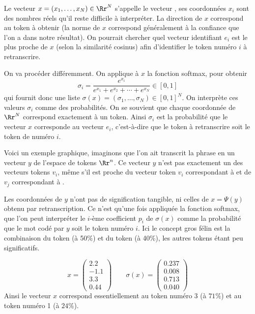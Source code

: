 \documentclass[11pt,class=report,crop=false]{standalone}
\begin{document}
Le vecteur $x = (x_1, \ldots, x_N) \in \Rr^N$ s'appelle le vecteur , ses coordonnées $x_i$ sont des nombres réels qu'il reste difficile à interpréter.
La direction de $x$ correspond au token à obtenir (la norme de $x$ correspond généralement à la confiance que l'on a dans notre résultat). On pourrait chercher quel vecteur identifiant $e_i$ est le plus proche de $x$ (selon la similarité cosinus) afin d'identifier le token numéro $i$ à retranscrire.

On va procéder différemment. On applique à $x$ la fonction softmax, pour obtenir
$$\sigma_i  = \frac{e^{x_i}}{ e^{x_1} + e^{x_2} + \cdots + e^{x_N}} \in [0,1]$$
qui fournit donc une liste $\sigma(x) = (\sigma_1,\ldots,\sigma_N) \in [0,1]^N$.
On interprète ces valeurs $\sigma_i$ comme des probabilités.
On se souvient que chaque coordonnée de $\Rr^N$ correspond exactement à un token.
Ainsi $\sigma_i$ est la probabilité que le vecteur $x$ corresponde au vecteur $e_i$, c'est-à-dire que le token à retranscrire soit le token de numéro $i$.


\begin{exemple}
Voici un exemple graphique, imaginons que l'on ait transcrit la phrase \og{}\fg{} en un vecteur $y$ de l'espace de tokens $\Rr^n$. Ce vecteur $y$ n'est pas exactement un des vecteurs tokens $v_i$, même s'il est proche du vecteur token $v_i$ correspondant à  et de $v_j$ correspondant à .


Les coordonnées de $y$ n'ont pas de signification tangible, ni celles de $x = \Psi(y)$ obtenu par retranscription. Ce n'est qu'une fois appliquée la fonction softmax, que l'on peut interpréter le $i$-ème coefficient $p_i$ de $\sigma(x)$ comme la probabilité que le mot codé par $y$ soit le token numéro $i$. Ici le concept \og{}gros félin\fg{} est la combinaison du token  (à 50\%) et du token  (à 40\%), les autres tokens étant peu significatifs.

	
\end{exemple}



\begin{exemple}
\[
x = 
\begin{pmatrix}
2.2 \\ -1.1 \\ 3.3 \\ 0.44	
\end{pmatrix}
\qquad
\sigma(x) = 
\begin{pmatrix}
0.237 \\ 0.008 \\ 0.713 \\ 0.040 
\end{pmatrix}
\]
Ainsi le vecteur $x$ correspond essentiellement au token numéro 3 (à $71\%$) et au token numéro 1 (à $24\%$).	
\end{exemple}
\end{document}
